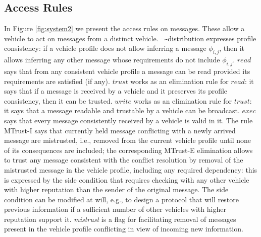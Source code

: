\documentclass[compsoc, conference, letterpaper, 10pt, times]{IEEEtran}
\begin{document}
\subsection{Access Rules}

In Figure \ref{fig:system2} we present the access rules on messages. These allow a vehicle to act on messages from a distinct vehicle. $\neg$-distribution expresses profile consistency: if a vehicle profile does not allow inferring a message $\phi_{i,j}$, then it allows inferring any other message whose requirements do not include $\phi_{i,j}$. $\mathit{read}$ says that from any consistent vehicle profile a message can be read provided its requirements are satisfied (if any). $\mathit{trust}$ works as an elimination rule for $read$: it says that if a message is received by a vehicle and it preserves its profile consistency, then it can be trusted. $\mathit{write}$ works as an elimination rule for $trust$: it says that a message readable and trustable by a vehicle can be broadcast. $\mathit{exec}$ says that every message consistently received by a vehicle is valid in it. The rule MTrust-I says that currently held message conflicting with a newly arrived message are mistrusted, i.e., removed from the current vehicle profile until none of its consequences are included; the corresponding MTrust-E elimination allows to trust any message consistent with the conflict resolution by removal of the mistrusted message in the vehicle profile, including any required dependency: this is expressed by the side condition that requires checking with any other vehicle with higher reputation than the sender of the original message. The side condition can be modified at will, e.g., to design a protocol that will restore previous information if a sufficient number of other vehicles with higher reputation support it. \textit{mistrust} is a flag for facilitating removal of messages present in the vehicle profile conflicting in view of incoming new information. 
\end{document}
